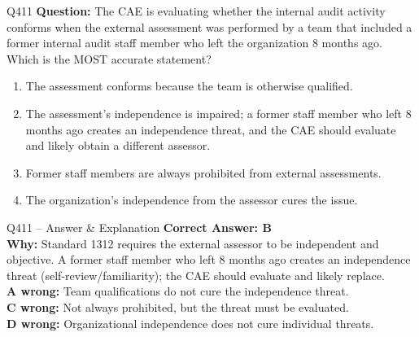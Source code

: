 \documentclass[aspectratio=169,10pt]{beamer}
\begin{document}
	\begin{frame}[t]{Q411}
		\small
		\textbf{Question:} The CAE is evaluating whether the internal audit activity conforms when the external assessment was performed by a team that included a former internal audit staff member who left the organization 8 months ago. Which is the MOST accurate statement?
		\begin{enumerate}[label=\Alph*.,itemsep=1pt,topsep=2pt]
			\item The assessment conforms because the team is otherwise qualified.
			\item The assessment's independence is impaired; a former staff member who left 8 months ago creates an independence threat, and the CAE should evaluate and likely obtain a different assessor.
			\item Former staff members are always prohibited from external assessments.
			\item The organization's independence from the assessor cures the issue.
		\end{enumerate}
	\end{frame}
	
	\begin{frame}[t]{Q411 -- Answer \& Explanation}
		\small
		\textbf{Correct Answer: B} \\[4pt]
		\textbf{Why:} Standard 1312 requires the external assessor to be independent and objective. A former staff member who left 8 months ago creates an independence threat (self-review/familiarity); the CAE should evaluate and likely replace. \\[4pt]
		\textbf{A wrong:} Team qualifications do not cure the independence threat. \\[2pt]
		\textbf{C wrong:} Not always prohibited, but the threat must be evaluated. \\[2pt]
		\textbf{D wrong:} Organizational independence does not cure individual threats.
	\end{frame}
	
\end{document}
